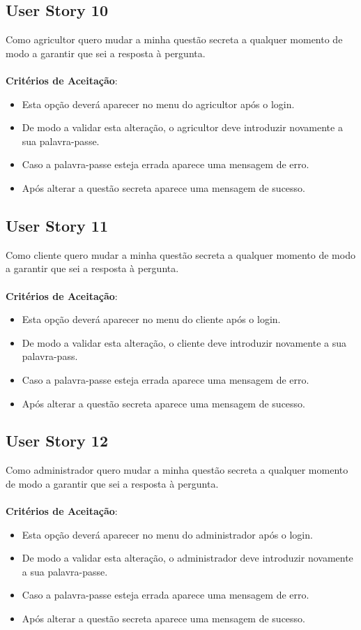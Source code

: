 \documentclass[a4paper,11pt]{article}
\begin{document}
\subsection{User Story 10}
Como agricultor quero mudar a minha questão secreta a qualquer momento de modo a garantir que sei a resposta à pergunta.\\\\
\textbf{Critérios de Aceitação}:
\begin{itemize}
  \item Esta opção deverá aparecer no menu do agricultor após o login.
  \item De modo a validar esta alteração, o agricultor deve introduzir novamente a sua palavra-passe.
  \item Caso a palavra-passe esteja errada aparece uma mensagem de erro.
  \item Após alterar a questão secreta aparece uma mensagem de sucesso.
\end{itemize}
\subsection{User Story 11}
Como cliente quero mudar a minha questão secreta a qualquer momento de modo a garantir que sei a resposta à pergunta.\\\\
\textbf{Critérios de Aceitação}:
\begin{itemize}
  \item Esta opção deverá aparecer no menu do cliente após o login.
  \item De modo a validar esta alteração, o cliente deve introduzir novamente a sua palavra-pass.
  \item Caso a palavra-passe esteja errada aparece uma mensagem de erro.
  \item Após alterar a questão secreta aparece uma mensagem de sucesso.
\end{itemize}
\subsection{User Story 12}
Como administrador quero mudar a minha questão secreta a qualquer momento de modo a garantir que sei a resposta à pergunta.\\\\
\textbf{Critérios de Aceitação}:
\begin{itemize}
  \item Esta opção deverá aparecer no menu do administrador após o login.
  \item De modo a validar esta alteração, o administrador deve introduzir novamente a sua palavra-passe.
  \item Caso a palavra-passe esteja errada aparece uma mensagem de erro.
  \item Após alterar a questão secreta aparece uma mensagem de sucesso.
\end{itemize}
\end{document}

